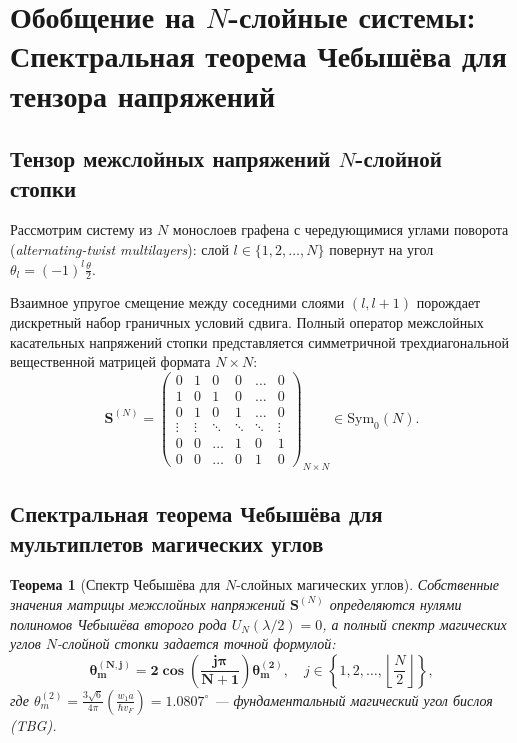 \documentclass[12pt,a4paper]{article}
\newtheorem{theorem}{Теорема}
\begin{document}
\section{Обобщение на $N$-слойные системы: Спектральная теорема Чебышёва для тензора напряжений}

\subsection{Тензор межслойных напряжений $N$-слойной стопки}
Рассмотрим систему из $N$ монослоев графена с чередующимися углами поворота (\textit{alternating-twist multilayers}): слой $l \in \{1, 2, \dots, N\}$ повернут на угол $\theta_l = (-1)^l \frac{\theta}{2}$.

Взаимное упругое смещение между соседними слоями $(l, l+1)$ порождает дискретный набор граничных условий сдвига. Полный оператор межслойных касательных напряжений стопки представляется симметричной трехдиагональной вещественной матрицей формата $N \times N$:
\begin{equation}
	\mathbf{S}^{(N)} = \begin{pmatrix} 
		0 & 1 & 0 & 0 & \dots & 0 \\
		1 & 0 & 1 & 0 & \dots & 0 \\
		0 & 1 & 0 & 1 & \dots & 0 \\
		\vdots & \vdots & \ddots & \ddots & \ddots & \vdots \\
		0 & 0 & \dots & 1 & 0 & 1 \\
		0 & 0 & \dots & 0 & 1 & 0 
	\end{pmatrix}_{N \times N} \in \mathrm{Sym}_0(N).
\end{equation}

\subsection{Спектральная теорема Чебышёва для мультиплетов магических углов}
\begin{theorem}[Спектр Чебышёва для $N$-слойных магических углов]
	Собственные значения матрицы межслойных напряжений $\mathbf{S}^{(N)}$ определяются нулями полиномов Чебышёва второго рода $U_N(\lambda/2) = 0$, а полный спектр магических углов $N$-слойной стопки задается точной формулой:
	\begin{equation}
		\mathbf{\theta_m^{(N, j)} = 2 \cos\left( \frac{j \pi}{N+1} \right) \theta_m^{(2)}}, \quad j \in \left\{1, 2, \dots, \left\lfloor \frac{N}{2} \right\rfloor \right\},
	\end{equation}
	где $\theta_m^{(2)} = \frac{3\sqrt{6}}{4\pi}\left(\frac{w_1 a}{\hbar v_F}\right) = 1.0807^\circ$ — фундаментальный магический угол бислоя (TBG).
\end{theorem}
\end{document}
